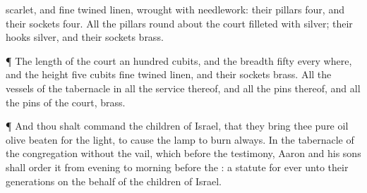{scarlet, and fine
twined
linen, wrought with
needlework:
{} their
pillars
{}
four, and their
sockets
four.
All the
pillars round
about the
court
{}
filleted with
silver; their
hooks
{}
silver, and their
sockets
{}
brass.
\par }{\PP {}¶ The
length of the
court
{} an
hundred
cubits, and the
breadth
fifty every
where, and the
height
five
cubits
{} fine
twined
linen, and their
sockets
{}
brass.
All the
vessels of the
tabernacle in all the
service thereof, and all the
pins thereof, and all the
pins of the
court,
{}
brass.
\par }{\PP {}¶ And thou shalt
command the
children of
Israel, that they
bring thee
pure
oil
olive
beaten for the
light, to cause the
lamp to
burn
always.
In the
tabernacle of the
congregation
without the
vail, which
{} before the
testimony,
Aaron and his
sons shall
order it from
evening to
morning
before the
{}:
{} a
statute for
ever unto their
generations on the behalf of the
children of
Israel.

}
